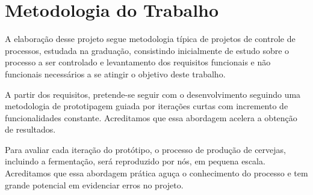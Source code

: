 \chapter{Metodologia do Trabalho}


A elaboração desse projeto segue metodologia típica de projetos de controle de
processos, estudada na graduação, consistindo inicialmente de estudo sobre o
processo a ser controlado e levantamento dos requisitos funcionais e não funcionais
necessários a se atingir o objetivo deste trabalho.


A partir dos requisitos, pretende-se seguir com o desenvolvimento seguindo uma
metodologia de prototipagem guiada por iterações curtas com incremento de
funcionalidades constante. Acreditamos que essa abordagem acelera a obtenção de
resultados.


Para avaliar cada iteração do protótipo, o processo de produção de cervejas,
incluindo a fermentação, será reproduzido por nós, em pequena escala. Acreditamos
que essa abordagem prática aguça o conhecimento do processo e tem grande
potencial em evidenciar erros no projeto.